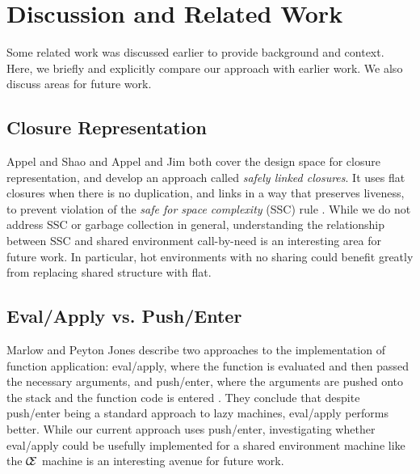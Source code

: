 \section{Discussion and Related Work} \label{sec:disc}

Some related work was discussed earlier to provide background and context. Here,
we briefly and explicitly compare our approach with earlier work. We also discuss
areas for future work.

\subsection{Closure Representation}
Appel and Shao \cite{shao1994space} and Appel and Jim \cite{appel1988optimizing}
both cover the design space for closure representation, and develop an approach
called \emph{safely linked closures}. It uses flat closures when
there is no duplication, and links in a way that preserves liveness, to prevent
violation of the \emph{safe for space complexity} (SSC) rule
\cite{shao1994space}. While we do not address SSC or garbage collection in
general, understanding the relationship between SSC and shared environment
call-by-need is an interesting area for future work. In particular, hot
environments with no sharing could benefit greatly from replacing shared
structure with flat.

\subsection{Eval/Apply vs. Push/Enter}
Marlow and Peyton Jones describe two approaches to the implementation of
function application: eval/apply, where the function is evaluated and then
passed the necessary arguments, and push/enter, where the arguments are pushed
onto the stack and the function code is entered \cite{marlow2006making}. They
conclude that despite push/enter being a standard approach to lazy machines,
eval/apply performs better. While our current approach uses push/enter,
investigating whether eval/apply could be usefully implemented for a shared
environment machine like the $\mathcal{\mathcal{C} \mskip -4mu \mathcal{E}}$
machine is an interesting avenue for future work.

